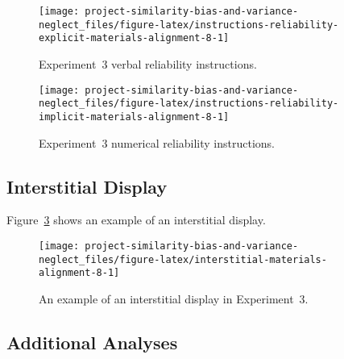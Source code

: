 \documentclass[
  english,
  man, donotrepeattitle,floatsintext]{apa7}
\theoremstyle{definition}
\theoremstyle{definition}
\theoremstyle{definition}
\theoremstyle{definition}
\theoremstyle{remark}
\begin{document}
\begin{figure}
\texttt{[image: project-similarity-bias-and-variance-neglect\_files/figure-latex/instructions-reliability-explicit-materials-alignment-8-1]} \caption{Experiment~3 verbal reliability instructions.}\label{fig:instructions-reliability-explicit-materials-alignment-8}
\end{figure}



\begin{figure}
\texttt{[image: project-similarity-bias-and-variance-neglect\_files/figure-latex/instructions-reliability-implicit-materials-alignment-8-1]} \caption{Experiment~3 numerical reliability instructions.}\label{fig:instructions-reliability-implicit-materials-alignment-8}
\end{figure}

\hypertarget{interstitial-materials-alignment-8}{%
\subsection{Interstitial Display}\label{interstitial-materials-alignment-8}}

Figure~\ref{fig:interstitial-materials-alignment-8} shows an example of an
interstitial display.



\begin{figure}
\texttt{[image: project-similarity-bias-and-variance-neglect\_files/figure-latex/interstitial-materials-alignment-8-1]} \caption{An example of an interstitial display in Experiment~3.}\label{fig:interstitial-materials-alignment-8}
\end{figure}

\hypertarget{results-alignment-8-allocation}{%
\subsection{Additional Analyses}\label{results-alignment-8-allocation}}
\end{document}
